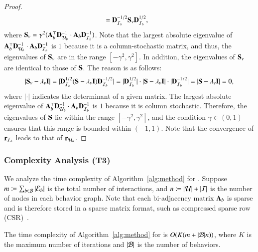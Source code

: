 \begin{proof}
\begin{align*}
    &= \mathbf{D}_{\mathcal{I}_b}^{-1/2}\mathbf{S}_{v}\mathbf{D}_{\mathcal{I}_b}^{1/2},
\end{align*}
where $\mathbf{S}_{v} = \gamma^{2}(\mathbf{A}_{b}^{\top}\mathbf{D}_{\mathcal{U}_b}^{-1}\cdot\mathbf{A}_{b}\mathbf{D}_{\mathcal{I}_b}^{-1})$. 
Note that the largest absolute eigenvalue of  $\mathbf{A}_{b}^{\top}\mathbf{D}_{\mathcal{U}_b}^{-1}\cdot\mathbf{A}_{b}\mathbf{D}_{\mathcal{I}_b}^{-1}$ is $1$ because it is a column-stochastic matrix, and thus, the eigenvalues of $\mathbf{S}_{v}$ are in the range $[-\gamma^2, \gamma^2]$.
In addition, the eigenvalues of $\mathbf{S}_{v}$ are identical to those of $\mathbf{S}$. 
The reason is as follows:
\begin{align*}
    |\mathbf{S}_{v} - \lambda_{v}\mathbf{I}| = |\mathbf{D}_{\mathcal{I}_b}^{1/2}(\mathbf{S} - \lambda_{v}\mathbf{I})\mathbf{D}_{\mathcal{I}_b}^{-1/2}| = 
    |\mathbf{D}_{\mathcal{I}_b}^{1/2}|\cdot|\mathbf{S} - \lambda_{v}\mathbf{I}|\cdot |\mathbf{D}_{\mathcal{I}_b}^{-1/2}| = |\mathbf{S} - \lambda_{v}\mathbf{I}| = 0,
\end{align*}
where $|\cdot|$ indicates the determinant of a given matrix. 
The largest absolute eigenvalue of  $\mathbf{A}_{b}^{\top}\mathbf{D}_{\mathcal{U}_b}^{-1}\cdot\mathbf{A}_{b}\mathbf{D}_{\mathcal{I}_b}^{-1}$ is $1$ because it is column stochastic.
Therefore, the eigenvalues of $\mathbf{S}$ lie within the range $[-\gamma^2, \gamma^2]$, and the condition $\gamma \in (0, 1)$ ensures that this range is bounded within $(-1, 1)$.
Note that the convergence of $\mathbf{r}_{\mathcal{I}_{b}}$ leads to that of $\mathbf{r}_{\mathcal{U}_{b}}$. 
\end{proof}


\subsubsection{Complexity Analysis  (T3)}
\label{sec:proposed:analysis_complexity}

We analyze the time complexity of Algorithm~\ref{alg:method} for \method. 
Suppose $m \coloneqq \sum_{b \in \mathcal{B}} |\mathcal{E}_{b}|$ is the total number of interactions, and $n \coloneqq |\mathcal{U}| + |\mathcal{I}|$ is the number of nodes in each behavior graph.
Note that each bi-adjacency matrix $\mathbf{A}_{b}$ is sparse and is therefore stored in a sparse matrix format, such as compressed sparse row (CSR)~\cite{daglib}.

\begin{theorem}
The time complexity of Algorithm~\ref{alg:method} for \method is $O(K  (m + |\mathcal{B}| n))$, where $K$ is the maximum number of iterations and $|\mathcal{B}|$ is the number of behaviors.
\end{theorem}

